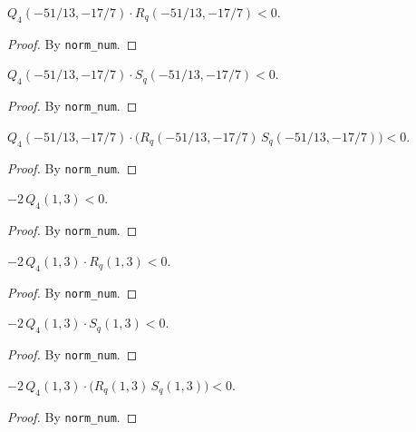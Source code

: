 \begin{lemma}[$Q_4 R_q$ at point 1]\label{Q4Rq_neg}\leanok
{}
$Q_{4}(-51/13,-17/7)\cdot R_{q}(-51/13,-17/7)<0$.
\end{lemma}
\begin{proof}\leanok
By \texttt{norm\_num}.
\end{proof}

\begin{lemma}[$Q_4 S_q$ at point 1]\label{Q4Sq_neg}\leanok
{}
$Q_{4}(-51/13,-17/7)\cdot S_{q}(-51/13,-17/7)<0$.
\end{lemma}
\begin{proof}\leanok
By \texttt{norm\_num}.
\end{proof}

\begin{lemma}[$Q_4 R_q S_q$ at point 1]\label{Q4RqSq_neg}\leanok
{}
$Q_{4}(-51/13,-17/7)\cdot\bigl(R_{q}(-51/13,-17/7)\,S_{q}(-51/13,-17/7)\bigr)<0$.
\end{lemma}
\begin{proof}\leanok
By \texttt{norm\_num}.
\end{proof}

\begin{lemma}[$-2Q_4$ at point 2]\label{n2Q4_neg}\leanok
{}
$-2\,Q_{4}(1,3)<0$.
\end{lemma}
\begin{proof}\leanok
By \texttt{norm\_num}.
\end{proof}

\begin{lemma}[$-2Q_4 R_q$ at point 2]\label{n2Q4Rq_neg}\leanok
{}
$-2\,Q_{4}(1,3)\cdot R_{q}(1,3)<0$.
\end{lemma}
\begin{proof}\leanok
By \texttt{norm\_num}.
\end{proof}

\begin{lemma}[$-2Q_4 S_q$ at point 2]\label{n2Q4Sq_neg}\leanok
{}
$-2\,Q_{4}(1,3)\cdot S_{q}(1,3)<0$.
\end{lemma}
\begin{proof}\leanok
By \texttt{norm\_num}.
\end{proof}

\begin{lemma}[$-2Q_4 R_q S_q$ at point 2]\label{n2Q4RqSq_neg}\leanok
{}
$-2\,Q_{4}(1,3)\cdot\bigl(R_{q}(1,3)\,S_{q}(1,3)\bigr)<0$.
\end{lemma}
\begin{proof}\leanok
By \texttt{norm\_num}.
\end{proof}

